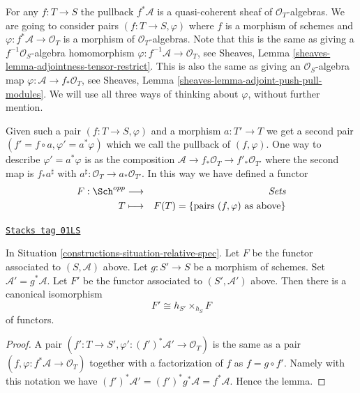 \medskip\noindent
For any $f : T \to S$ the pullback
$f^*\mathcal{A}$ is a quasi-coherent sheaf of $\mathcal{O}_T$-algebras.
We are going to consider pairs $(f : T \to S, \varphi)$ where
$f$ is a morphism of schemes and $\varphi : f^*\mathcal{A} \to \mathcal{O}_T$
is a morphism of $\mathcal{O}_T$-algebras. Note that this is the
same as giving a $f^{-1}\mathcal{O}_S$-algebra homomorphism
$\varphi : f^{-1}\mathcal{A} \to \mathcal{O}_T$, see
Sheaves, Lemma \ref{sheaves-lemma-adjointness-tensor-restrict}.
This is also the same as giving an $\mathcal{O}_S$-algebra map
$\varphi : \mathcal{A} \to f_*\mathcal{O}_T$, see
Sheaves, Lemma \ref{sheaves-lemma-adjoint-push-pull-modules}.
We will use all three ways of thinking about $\varphi$,
without further mention.

\medskip\noindent
Given such a
pair $(f : T \to S, \varphi)$ and a morphism $a : T' \to T$ we get
a second pair $(f' = f \circ a, \varphi' = a^*\varphi)$ which we
call the pullback of $(f, \varphi)$. One way to describe
$\varphi' = a^*\varphi$ is as the composition
$\mathcal{A} \to f_*\mathcal{O}_T \to f'_*\mathcal{O}_{T'}$
where the second map is $f_*a^\sharp$ with
$a^\sharp : \mathcal{O}_T \to a_*\mathcal{O}_{T'}$.
In this way we have defined a functor
\begin{eqnarray}
\label{equation-spec}
F : \Sch^{opp} & \longrightarrow & \textit{Sets} \\
T & \longmapsto & F(T) = \{\text{pairs }(f, \varphi) \text{ as above}\}
\nonumber
\end{eqnarray}

\begin{lemma}
\label{constructions-lemma-spec-base-change}
\href{https://stacks.math.columbia.edu/tag/01LS}{\texttt{Stacks tag 01LS}}

In Situation \ref{constructions-situation-relative-spec}.
Let $F$ be the functor
associated to $(S, \mathcal{A})$ above.
Let $g : S' \to S$ be a morphism of schemes.
Set $\mathcal{A}' = g^*\mathcal{A}$. Let $F'$ be the
functor associated to $(S', \mathcal{A}')$ above.
Then there is a canonical isomorphism
$$
F' \cong h_{S'} \times_{h_S} F
$$
of functors.
\end{lemma}

\begin{proof}
A pair $(f' : T \to S', \varphi' : (f')^*\mathcal{A}' \to \mathcal{O}_T)$
is the same as a pair $(f, \varphi : f^*\mathcal{A} \to \mathcal{O}_T)$
together with a factorization of $f$ as $f = g \circ f'$. Namely with
this notation we have
$(f')^* \mathcal{A}' = (f')^*g^*\mathcal{A} = f^*\mathcal{A}$.
Hence the lemma.
\end{proof}

